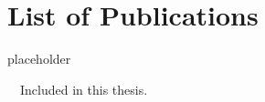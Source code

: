 \chapter*{List of Publications}
\label{publications}

\begin{etaremune}{%
\item placeholder
}\end{etaremune}

\vspace{0.5cm}
\noindent
\faFileTextO~~Included in this thesis.\\
